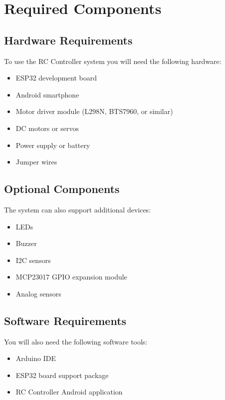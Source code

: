 \chapter{Required Components}

\section{Hardware Requirements}

To use the RC Controller system you will need the following hardware:

\begin{itemize}
	\item ESP32 development board
	\item Android smartphone
	\item Motor driver module (L298N, BTS7960, or similar)
	\item DC motors or servos
	\item Power supply or battery
	\item Jumper wires
\end{itemize}

\section{Optional Components}

The system can also support additional devices:

\begin{itemize}
	\item LEDs
	\item Buzzer
	\item I2C sensors
	\item MCP23017 GPIO expansion module
	\item Analog sensors
\end{itemize}

\section{Software Requirements}

You will also need the following software tools:

\begin{itemize}
	\item Arduino IDE
	\item ESP32 board support package
	\item RC Controller Android application
\end{itemize}